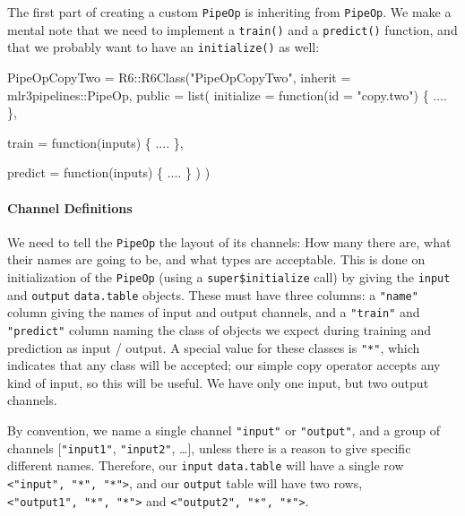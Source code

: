 \documentclass[]{article}
\newenvironment{Shaded}{}{}
\newcommand{\ControlFlowTok}[1]{\textcolor[rgb]{0.00,0.00,1.00}{#1}}
\newcommand{\DataTypeTok}[1]{#1}
\newcommand{\KeywordTok}[1]{\textcolor[rgb]{0.00,0.00,1.00}{#1}}
\newcommand{\NormalTok}[1]{#1}
\newcommand{\OperatorTok}[1]{#1}
\newcommand{\StringTok}[1]{\textcolor[rgb]{0.00,0.50,0.50}{#1}}
\let\oldparagraph\paragraph
\renewcommand{\paragraph}[1]{\oldparagraph{#1}\mbox{}}
\renewenvironment{Shaded} {\begin{snugshade}\small} {\end{snugshade}}
\begin{document}
The first part of creating a custom \texttt{PipeOp} is inheriting from \texttt{PipeOp}.
We make a mental note that we need to implement a \texttt{train()} and a \texttt{predict()} function, and that we probably want to have an \texttt{initialize()} as well:

\begin{Shaded}
\begin{Highlighting}[]
\NormalTok{PipeOpCopyTwo =}\StringTok{ }\NormalTok{R6}\OperatorTok{::}\KeywordTok{R6Class}\NormalTok{(}\StringTok{"PipeOpCopyTwo"}\NormalTok{,}
  \DataTypeTok{inherit =}\NormalTok{ mlr3pipelines}\OperatorTok{::}\NormalTok{PipeOp,}
  \DataTypeTok{public =} \KeywordTok{list}\NormalTok{(}
    \DataTypeTok{initialize =} \ControlFlowTok{function}\NormalTok{(}\DataTypeTok{id =} \StringTok{"copy.two"}\NormalTok{) \{}
\NormalTok{      ....}
\NormalTok{    \},}

    \DataTypeTok{train =} \ControlFlowTok{function}\NormalTok{(inputs) \{}
\NormalTok{      ....}
\NormalTok{    \},}

    \DataTypeTok{predict =} \ControlFlowTok{function}\NormalTok{(inputs) \{}
\NormalTok{      ....}
\NormalTok{    \}}
\NormalTok{  )}
\NormalTok{)}
\end{Highlighting}
\end{Shaded}

\hypertarget{channel-definitions}{%
\paragraph{Channel Definitions}\label{channel-definitions}}

We need to tell the \texttt{PipeOp} the layout of its channels: How many there are, what their names are going to be, and what types are acceptable.
This is done on initialization of the \texttt{PipeOp} (using a \texttt{super\$initialize} call) by giving the \texttt{input} and \texttt{output} \texttt{data.table} objects.
These must have three columns: a \texttt{"name"} column giving the names of input and output channels, and a \texttt{"train"} and \texttt{"predict"} column naming the class of objects we expect during training and prediction as input / output.
A special value for these classes is \texttt{"*"}, which indicates that any class will be accepted; our simple copy operator accepts any kind of input, so this will be useful. We have only one input, but two output channels.

By convention, we name a single channel \texttt{"input"} or \texttt{"output"}, and a group of channels {[}\texttt{"input1"}, \texttt{"input2"}, \ldots{}{]}, unless there is a reason to give specific different names. Therefore, our \texttt{input} \texttt{data.table} will have a single row \texttt{\textless{}"input",\ "*",\ "*"\textgreater{}}, and our \texttt{output} table will have two rows, \texttt{\textless{}"output1",\ "*",\ "*"\textgreater{}} and \texttt{\textless{}"output2",\ "*",\ "*"\textgreater{}}.
\end{document}
